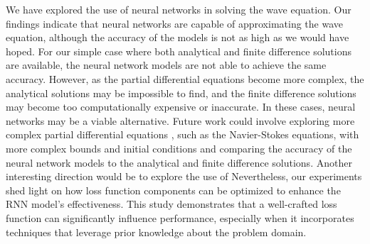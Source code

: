 \documentclass[twoside,11pt]{report}
\begin{document}
    We have explored the use of neural networks in solving the wave equation. Our findings indicate that
    neural networks are capable of approximating the wave equation, although the accuracy of the models
    is not as high as we would have hoped. For our simple case where both analytical and finite difference
    solutions are available, the neural network models are not able to achieve the same accuracy. 
    However, as the partial differential equations become
    more complex, the analytical solutions may be impossible to find, and the finite difference solutions
    may become too computationally expensive or inaccurate. In these cases, neural networks may be a
    viable alternative.
    Future work could involve exploring more complex partial differential equations , such as the
    Navier-Stokes equations, with more complex bounds and initial conditions 
    and comparing the accuracy of the neural network models to the analytical
    and finite difference solutions. Another interesting direction would be to explore the use of
    Nevertheless, our experiments shed light on how loss function components can be optimized 
    to enhance the RNN model's effectiveness. This study demonstrates that a well-crafted loss 
    function can significantly influence performance, especially when it incorporates techniques 
    that leverage prior knowledge about the problem domain.
    
     





%
%
%
%




\vskip 0.2in

% 

\end{document}
